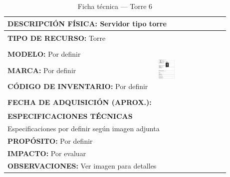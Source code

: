 \begin{table}[H]
\centering
\caption{Ficha técnica --- Torre 6}
\label{tab:torre-6}
\begin{tabular}{|p{}|p{}|}
\hline
\multicolumn{2}{|l|}{\textbf{DESCRIPCIÓN FÍSICA:} Servidor tipo torre} \\ \hline
\textbf{TIPO DE RECURSO:} Torre & 
\multirow{5}{*}{\includegraphics[width=0.25\textwidth,height=4cm,keepaspectratio]{tablas-images/cp1/torres/torre-6.png}} \\ \cline{1-1}
\textbf{MODELO:} Por definir & \\ \cline{1-1}
\textbf{MARCA:} Por definir & \\ \cline{1-1}
\textbf{CÓDIGO DE INVENTARIO:} Por definir & \\ \cline{1-1}
\textbf{FECHA DE ADQUISICIÓN (APROX.):} & \\ \hline
\multicolumn{2}{|l|}{\textbf{ESPECIFICACIONES TÉCNICAS}} \\ \hline
\multicolumn{2}{|p{0.95\textwidth}|}{
\footnotesize
Especificaciones por definir según imagen adjunta
} \\ \hline
\multicolumn{2}{|l|}{\textbf{PROPÓSITO:} Por definir} \\ \hline
\multicolumn{2}{|l|}{\textbf{IMPACTO:} Por evaluar} \\ \hline
\multicolumn{2}{|l|}{\textbf{OBSERVACIONES:} Ver imagen para detalles} \\ \hline
\end{tabular}
\end{table}

